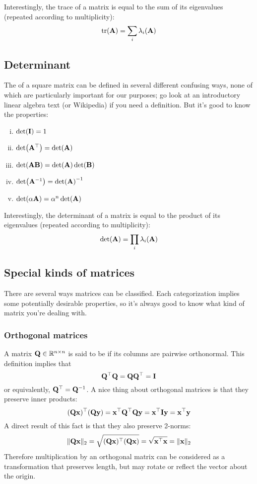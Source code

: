Interestingly, the trace of a matrix is equal to the sum of its eigenvalues (repeated according to multiplicity):
\[\tr(\mathbf{A}) = \sum_i \lambda_i(\mathbf{A})\]

\subsection{Determinant}
The  of a square matrix can be defined in several different confusing ways, none of which are particularly important for our purposes; go look at an introductory linear algebra text (or Wikipedia) if you need a definition.
But it's good to know the properties:
\begin{enumerate}[(i)]
\item $\det(\mathbf{I}) = 1$
\item $\det(\mathbf{A}^\top) = \det(\mathbf{A})$
\item $\det(\mathbf{A}\mathbf{B}) = \det(\mathbf{A})\det(\mathbf{B})$
\item $\det(\mathbf{A}^{-1}) = \det(\mathbf{A})^{-1}$
\item $\det(\alpha\mathbf{A}) = \alpha^n \det(\mathbf{A})$
\end{enumerate}
Interestingly, the determinant of a matrix is equal to the product of its eigenvalues (repeated according to multiplicity):
\[\det(\mathbf{A}) = \prod_i \lambda_i(\mathbf{A})\]

\subsection{Special kinds of matrices}
There are several ways matrices can be classified.
Each categorization implies some potentially desirable properties, so it's always good to know what kind of matrix you're dealing with.

\subsubsection{Orthogonal matrices}
A matrix $\mathbf{Q} \in \mathbb{R}^{n \times n}$ is said to be  if its columns are pairwise orthonormal.
This definition implies that
\[\mathbf{Q}^\top \mathbf{Q} = \mathbf{Q}\mathbf{Q}^\top = \mathbf{I}\]
or equivalently, $\mathbf{Q}^\top = \mathbf{Q}^{-1}$. A nice thing about orthogonal matrices is that they preserve inner products:
\[(\mathbf{Q}\mathbf{x})^\top(\mathbf{Q}\mathbf{y}) = \mathbf{x}^\top \mathbf{Q}^\top \mathbf{Q}\mathbf{y} = \mathbf{x}^\top \mathbf{I}\mathbf{y} = \mathbf{x}^\top\mathbf{y}\]
A direct result of this fact is that they also preserve 2-norms:
\[\|\mathbf{Q}\mathbf{x}\|_2 = \sqrt{(\mathbf{Q}\mathbf{x})^\top(\mathbf{Q}\mathbf{x})} = \sqrt{\mathbf{x}^\top\mathbf{x}} = \|\mathbf{x}\|_2\]
Therefore multiplication by an orthogonal matrix can be considered as a transformation that preserves length, but may rotate or reflect the vector about the origin.

